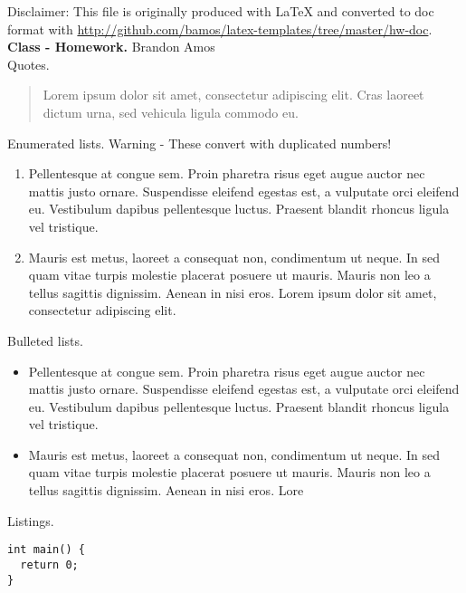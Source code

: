 \documentclass[12pt]{hwdoc}
\begin{document}
Disclaimer: This file is originally produced with LaTeX and
converted to doc format with
\url{http://github.com/bamos/latex-templates/tree/master/hw-doc}. \\

\headerline{\today}
{\bf Class - Homework.}
{Brandon Amos} \\

Quotes.
\begin{quote}
  Lorem ipsum dolor sit amet, consectetur adipiscing elit. Cras laoreet 
  dictum urna, sed vehicula ligula commodo eu.
\end{quote}

Enumerated lists. Warning - These convert with duplicated numbers!
\begin{enumerate}
  \item Pellentesque at congue sem. Proin pharetra risus 
    eget augue auctor nec mattis justo ornare. Suspendisse eleifend 
    egestas est, a vulputate orci eleifend eu. Vestibulum dapibus 
    pellentesque luctus. Praesent blandit rhoncus ligula vel tristique. 
  \item Mauris est metus, laoreet a consequat non, condimentum ut neque. In 
    sed quam vitae turpis molestie placerat posuere ut mauris. Mauris non leo a
    tellus sagittis dignissim. Aenean in nisi eros.
    Lorem ipsum dolor sit amet, consectetur adipiscing elit.
\end{enumerate}

Bulleted lists.
\begin{itemize}
  \item Pellentesque at congue sem. Proin pharetra risus 
    eget augue auctor nec mattis justo ornare. Suspendisse eleifend 
    egestas est, a vulputate orci eleifend eu. Vestibulum dapibus 
    pellentesque luctus. Praesent blandit rhoncus ligula vel tristique. 
  \item Mauris est metus, laoreet a consequat non, condimentum ut neque. In 
    sed quam vitae turpis molestie placerat posuere ut mauris. Mauris non leo a
    tellus sagittis dignissim. Aenean in nisi eros.
    Lore
\end{itemize}

Listings.
\begin{lstlisting}
int main() {
  return 0;
}
\end{lstlisting}
\end{document}
